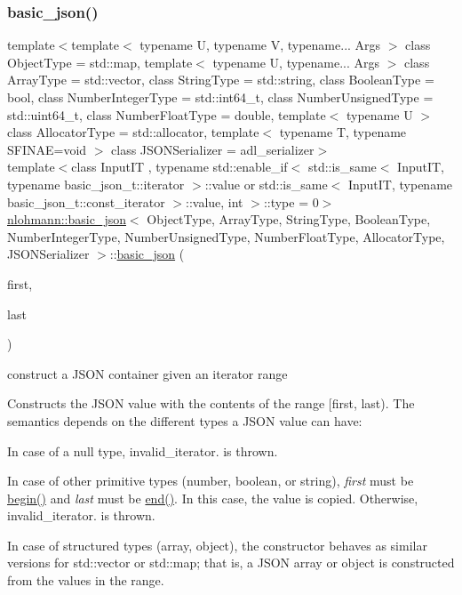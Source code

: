 \subsubsection{\texorpdfstring{basic\+\_\+json()}{basic\_json()}\hspace{0.1cm}{\footnotesize\ttfamily [6/8]}}
{\footnotesize\ttfamily template$<$template$<$ typename U, typename V, typename... Args $>$ class Object\+Type = std\+::map, template$<$ typename U, typename... Args $>$ class Array\+Type = std\+::vector, class String\+Type  = std\+::string, class Boolean\+Type  = bool, class Number\+Integer\+Type  = std\+::int64\+\_\+t, class Number\+Unsigned\+Type  = std\+::uint64\+\_\+t, class Number\+Float\+Type  = double, template$<$ typename U $>$ class Allocator\+Type = std\+::allocator, template$<$ typename T, typename S\+F\+I\+N\+A\+E=void $>$ class J\+S\+O\+N\+Serializer = adl\+\_\+serializer$>$ \\
template$<$class Input\+IT , typename std\+::enable\+\_\+if$<$ std\+::is\+\_\+same$<$ Input\+I\+T, typename basic\+\_\+json\+\_\+t\+::iterator $>$\+::value or std\+::is\+\_\+same$<$ Input\+I\+T, typename basic\+\_\+json\+\_\+t\+::const\+\_\+iterator $>$\+::value, int $>$\+::type  = 0$>$ \\
\mbox{\hyperlink{classnlohmann_1_1basic__json}{nlohmann\+::basic\+\_\+json}}$<$ Object\+Type, Array\+Type, String\+Type, Boolean\+Type, Number\+Integer\+Type, Number\+Unsigned\+Type, Number\+Float\+Type, Allocator\+Type, J\+S\+O\+N\+Serializer $>$\+::\mbox{\hyperlink{classnlohmann_1_1basic__json}{basic\+\_\+json}} (\begin{DoxyParamCaption}\item[{Input\+IT}]{first,  }\item[{Input\+IT}]{last }\end{DoxyParamCaption})\hspace{0.3cm}{\ttfamily [inline]}}



construct a J\+S\+ON container given an iterator range 

Constructs the J\+S\+ON value with the contents of the range {\ttfamily \mbox{[}first, last)}. The semantics depends on the different types a J\+S\+ON value can have\+:
\begin{DoxyItemize}
\item In case of a null type, invalid\+\_\+iterator. is thrown.
\item In case of other primitive types (number, boolean, or string), {\itshape first} must be {\ttfamily \mbox{\hyperlink{classnlohmann_1_1basic__json_a0ff28dac23f2bdecee9564d07f51dcdc}{begin()}}} and {\itshape last} must be {\ttfamily \mbox{\hyperlink{classnlohmann_1_1basic__json_a13e032a02a7fd8a93fdddc2fcbc4763c}{end()}}}. In this case, the value is copied. Otherwise, invalid\+\_\+iterator. is thrown.
\item In case of structured types (array, object), the constructor behaves as similar versions for {\ttfamily std\+::vector} or {\ttfamily std\+::map}; that is, a J\+S\+ON array or object is constructed from the values in the range.
\end{DoxyItemize}


